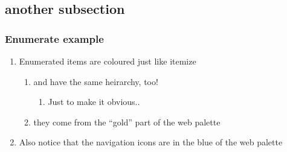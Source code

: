 \documentclass[aspectratio=1610,bigger,utf8]{beamer}
\begin{document}
\subsection{another subsection}
\begin{frame}
	\frametitle{Enumerate example}
	\begin{enumerate}
		\item Enumerated items are coloured just like itemize
			\begin{enumerate}
				\item and have the same heirarchy, too!
					\begin{enumerate}
						\item Just to make it obvious..

					\end{enumerate}
				\item they come from the ``gold'' part of the web palette
			\end{enumerate}
		\item Also notice that the navigation icons are in the blue of the web
			palette
	\end{enumerate}
\end{frame}
\end{document}
